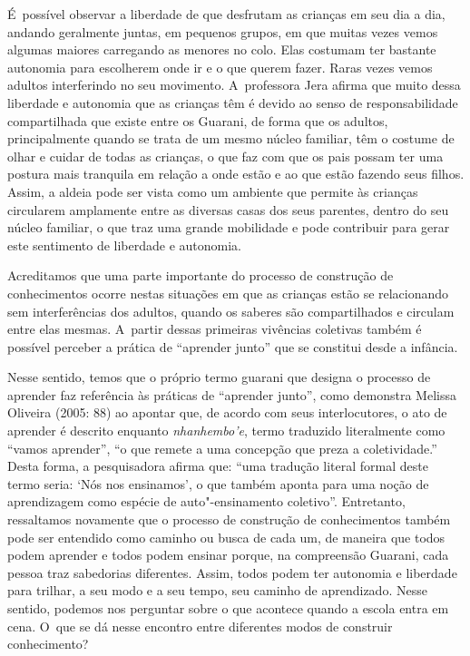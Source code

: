 É~possível observar a liberdade de que desfrutam as crianças em seu dia a
dia, andando geralmente juntas, em pequenos grupos, em que muitas vezes
vemos algumas maiores carregando as menores no colo. Elas costumam ter
bastante autonomia para escolherem onde ir e o que querem fazer. Raras
vezes vemos adultos interferindo no seu movimento. A~professora Jera
afirma que muito dessa liberdade e autonomia que as crianças têm é
devido ao senso de responsabilidade compartilhada que existe entre os
Guarani, de forma que os adultos, principalmente quando se trata de um
mesmo núcleo familiar, têm o costume de olhar e cuidar de todas as
crianças, o que faz com que os pais possam ter uma postura mais
tranquila em relação a onde estão e ao que estão fazendo seus filhos.
Assim, a aldeia pode ser vista como um ambiente que permite às crianças
circularem amplamente entre as diversas casas dos seus parentes, dentro
do seu núcleo familiar, o que traz uma grande mobilidade e pode
contribuir para gerar este sentimento de liberdade e autonomia. 

Acreditamos que uma parte importante do processo de construção de
conhecimentos ocorre nestas situações em que as crianças estão se
relacionando sem interferências dos adultos, quando os saberes são
compartilhados e circulam entre elas mesmas. A~partir dessas primeiras
vivências coletivas também é possível perceber a prática de ``aprender
junto'' que se constitui desde a infância.

Nesse sentido, temos que o próprio termo guarani que designa o processo
de aprender faz referência às práticas de ``aprender junto'', como
demonstra Melissa Oliveira (2005: 88) ao apontar que, de acordo com
seus interlocutores, o ato de aprender é descrito enquanto \emph{nhanhembo’e},
termo traduzido literalmente como ``vamos aprender'', ``o que remete a uma
concepção que preza a coletividade.'' Desta forma, a pesquisadora afirma
que: ``uma tradução literal formal deste termo seria: ‘Nós nos
ensinamos’, o que também aponta para uma noção de aprendizagem como
espécie de auto"-ensinamento coletivo''. Entretanto, ressaltamos
novamente que o processo de construção de conhecimentos também pode ser
entendido como caminho ou busca de cada um, de maneira que todos podem
aprender e todos podem ensinar porque, na compreensão Guarani, cada
pessoa traz sabedorias diferentes. Assim, todos podem ter autonomia e
liberdade para trilhar, a seu modo e a seu tempo, seu caminho de
aprendizado. Nesse sentido, podemos nos perguntar sobre o que acontece
quando a escola entra em cena. O~que se dá nesse encontro entre
diferentes modos de construir conhecimento?

